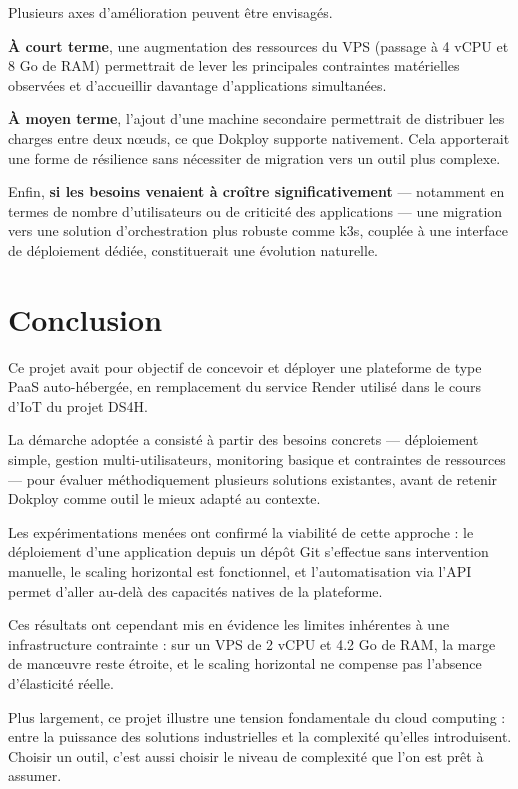 \documentclass{rapportClass} %
\begin{document}
Plusieurs axes d'amélioration peuvent être envisagés.

\textbf{À court terme}, une augmentation des ressources du VPS (passage à 4
vCPU et 8 Go de RAM) permettrait de lever les principales contraintes
matérielles observées et d'accueillir davantage d'applications
simultanées.

\textbf{À moyen terme}, l'ajout d'une machine secondaire permettrait de
distribuer les charges entre deux nœuds, ce que Dokploy supporte
nativement. Cela apporterait une forme de résilience sans nécessiter
de migration vers un outil plus complexe.

Enfin, \textbf{si les besoins venaient à croître significativement} — notamment
en termes de nombre d'utilisateurs ou de criticité des applications —
une migration vers une solution d'orchestration plus robuste comme
k3s, couplée à une interface de déploiement dédiée, constituerait une
évolution naturelle.

\chapter{Conclusion}

Ce projet avait pour objectif de concevoir et déployer une plateforme
de type PaaS auto-hébergée, en remplacement du service Render utilisé
dans le cours d'IoT du projet DS4H.

\smallskip
La démarche adoptée a consisté à partir des besoins concrets —
déploiement simple, gestion multi-utilisateurs, monitoring basique et
contraintes de ressources — pour évaluer méthodiquement plusieurs
solutions existantes, avant de retenir Dokploy comme outil le mieux
adapté au contexte.

\smallskip
Les expérimentations menées ont confirmé la viabilité de cette
approche : le déploiement d'une application depuis un dépôt Git
s'effectue sans intervention manuelle, le scaling horizontal est
fonctionnel, et l'automatisation via l'API permet d'aller au-delà
des capacités natives de la plateforme.

\smallskip
Ces résultats ont cependant mis en évidence les limites inhérentes à
une infrastructure contrainte : sur un VPS de 2 vCPU et 4.2 Go de
RAM, la marge de manœuvre reste étroite, et le scaling horizontal
ne compense pas l'absence d'élasticité réelle.

\smallskip
Plus largement, ce projet illustre une tension fondamentale du cloud
computing : entre la puissance des solutions industrielles et la
complexité qu'elles introduisent. Choisir un outil, c'est aussi
choisir le niveau de complexité que l'on est prêt à assumer.
\end{document}
